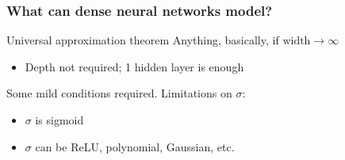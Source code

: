 \begin{frame}
    \frametitle{What can dense neural networks model?}
    \begin{block}{Universal approximation theorem}
        Anything, basically, if $\text{width} \to \infty$
        \begin{itemize}
            \item Depth not required; 1 hidden layer is enough
        \end{itemize}
    \end{block}

    Some mild conditions required.
    Limitations on $\sigma$:
    \begin{itemize}
        \item $\sigma$ is sigmoid \citep{CybenkoMCSS89,HornikNN89,HornikNN91}
        \item $\sigma$ can be ReLU, polynomial, Gaussian, etc. \citep{SonodaACHA}
    \end{itemize}
\end{frame}


